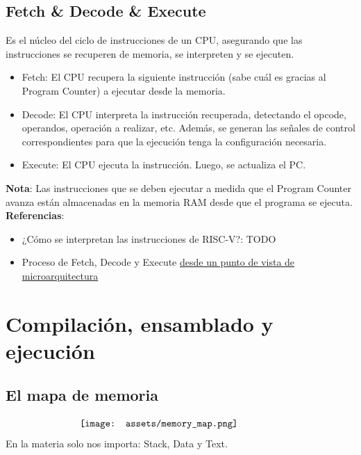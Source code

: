 \documentclass[10pt,a4paper]{article}
\begin{document}
\subsection*{Fetch \& Decode \& Execute}
Es el núcleo del ciclo de instrucciones de un CPU, asegurando que las instrucciones se recuperen de memoria, se interpreten y se ejecuten. \\
\begin{itemize}
    \item Fetch: El CPU recupera la siguiente instrucción (sabe cuál es gracias al Program Counter) a ejecutar desde la memoria. 
    \item Decode: El CPU interpreta la instrucción recuperada, detectando el opcode, operandos, operación a realizar, etc. Además, se generan las señales de control correspondientes para que la ejecución tenga la configuración necesaria.
    \item Execute: El CPU ejecuta la instrucción. Luego, se actualiza el PC.
\end{itemize}
\textbf{Nota}: Las instrucciones que se deben ejecutar a medida que el Program Counter avanza están almacenadas en la memoria RAM desde que el programa se ejecuta. \\
\textbf{Referencias}: 
\begin{itemize}
    \item ¿Cómo se interpretan las instrucciones de RISC-V?: TODO
    \item Proceso de Fetch, Decode y Execute \hyperref[subsec:datapath_example]{desde un punto de vista de microarquitectura}
\end{itemize}
\section*{Compilación, ensamblado y ejecución}
\subsection*{El mapa de memoria}
\[\begin{minipage}[b]{0.6\textwidth}
    \texttt{[image: assets/memory\_map.png]}
    \label{fig:memory_map}
\end{minipage}\]
En la materia solo nos importa: Stack, Data y Text.
\end{document}
